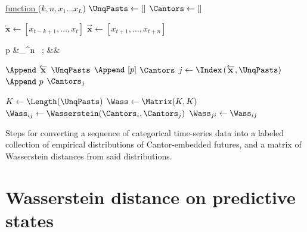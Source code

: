 \documentclass[sigconf, anonymous, review]{acmart}
\begin{document}
\begin{algorithm}[t]
   
  
  \underline{function \CantorWasserstein} ($k,n,x_1\dots x_L$)\;
  $\UnqPasts \leftarrow \left[\right]$\; 
  $\Cantors \leftarrow \left[\right]$\; 
   { 
    $\overleftarrow{\mathbf{x}} \leftarrow \left[x_{t-k+1},\dots, x_{t}\right]$\;
    $\overrightarrow{\mathbf{x}} \leftarrow \left[x_{t+1},\dots, x_{t+n}\right]$\;
      \vspace{-1.5em}
      \begin{flalign*}
        p &\leftarrow \sum_{}^n
        \ ; &&
      \end{flalign*}

       { 
        $\Append\ \overleftarrow{\mathbf{x}}$ \KwTo $\UnqPasts$\; 
        $\Append\ [p]$ \KwTo $\Cantors$\; 
        } { 
        $j \leftarrow \Index\left(\overleftarrow{\mathbf{x}},\UnqPasts\right)$\;
        $\Append\ p$ \KwTo $\Cantors_j$\; 
        } 
  }
  $K \leftarrow \Length(\UnqPasts)$\; 
  $\Wass \leftarrow \Matrix(K,K)$\;
   { 
     {  
      $\Wass_{ij}
        \leftarrow
        \Wasserstein(\Cantors_i,\Cantors_j)$\;
        $\Wass_{j i} \leftarrow \Wass_{i j}$\; } } 
  \KwResult{$\UnqPasts$,$\Cantors$,$\Wass$}
  \caption{Steps for converting a sequence of categorical time-series data
        into a labeled collection of empirical distributions of Cantor-embedded futures,
        and a matrix of Wasserstein distances from said distributions.}
  \label{alg:cantorwass}
\end{algorithm}

\section{Wasserstein distance on predictive states}
\end{document}
